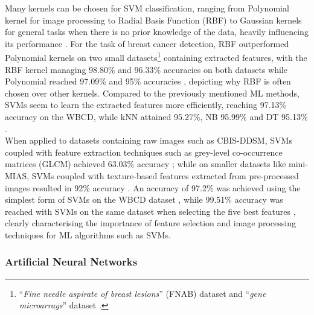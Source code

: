 Many kernels can be chosen for SVM classification, ranging from Polynomial kernel for image processing to Radial Basis Function (RBF) to Gaussian kernels for general tasks when there is no prior knowledge of the data, heavily influencing its performance \citep{amari1999improving}. For the task of breast cancer detection, RBF outperformed Polynomial kernels on two small datasets\footnote{``\textit{Fine needle aspirate of breast lesions}'' (FNAB) dataset and ``\textit{gene microarrays}'' dataset \citep{Osareh2010}.} containing extracted features, with the RBF kernel managing 98.80\% and 96.33\% accuracies on both datasets while Polynomial reached 97.09\% and 95\% accuracies \citep{Osareh2010}, depicting why RBF is often chosen over other kernels. Compared to the previously mentioned ML methods, SVMs seem to learn the extracted features more efficiently, reaching 97.13\% accuracy on the WBCD, while kNN attained 95.27\%, NB 95.99\% and DT 95.13\% \citep{Asri2016}. \\

When applied to datasets containing raw images such as CBIS-DDSM, SVMs coupled with feature extraction techniques such as grey-level co-occurrence matrices (GLCM) achieved 63.03\% accuracy \citep{Sarosa2018}; while on smaller datasets like  mini-MIAS, SVMs coupled with texture-based features extracted from pre-processed images resulted in 92\% accuracy \citep{Vishrutha2014}. An accuracy of 97.2\% was achieved using the simplest form of SVMs on the WBCD dataset \citep{Bennett1998}, while 99.51\% accuracy was reached with SVMs on the same dataset when selecting the five best features \citep{Akay2009}, clearly characterising the importance of feature selection and image processing techniques for ML algorithms such as SVMs.

\subsubsection{Artificial Neural Networks}
\label{sec:litsurvey-anns}

